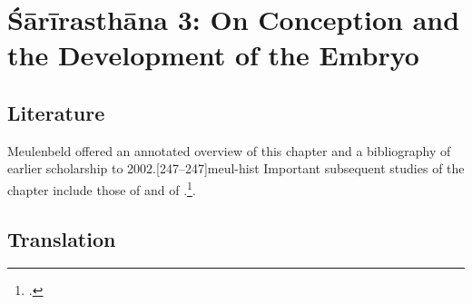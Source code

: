 
\chapter{Śārīrasthāna 3:  On Conception and the Development of the 
Embryo}


\section{Literature} 

Meulenbeld offered an annotated overview of this chapter and a
bibliography of earlier scholarship to
2002.[247--247]{meul-hist}  Important subsequent 
studies of the chapter include those of \citeauthor{das-2003} and of
\citeauthor{krit-2009}.\footcites[ch.\,8, \emph{et 
passim}]{das-2003}{krit-2009,krit-2013}.

\newpage
\section{Translation}


